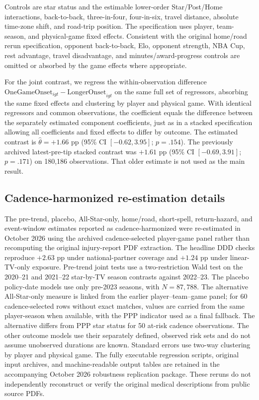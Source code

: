 \documentclass[11pt]{article}
\begin{document}
Controls are star status and the estimable lower-order Star/Post/Home interactions, back-to-back, three-in-four, four-in-six, travel distance, absolute time-zone shift, and road-trip position. The specification uses player, team-season, and physical-game fixed effects. Consistent with the original home/road rerun specification, opponent back-to-back, Elo, opponent strength, NBA Cup, rest advantage, travel disadvantage, and minutes/award-progress controls are omitted or absorbed by the game effects where appropriate.

For the joint contrast, we regress the within-observation difference $\mathrm{OneGameOnset}_{igt}-\mathrm{LongerOnset}_{igt}$ on the same full set of regressors, absorbing the same fixed effects and clustering by player and physical game. With identical regressors and common observations, the coefficient equals the difference between the separately estimated component coefficients, just as in a stacked specification allowing all coefficients and fixed effects to differ by outcome. The estimated contrast is $\hat\theta=+1.66$ pp (95\% CI $[-0.62,3.95]$; $p = .154$). The previously archived latest-pre-tip stacked contrast was $+1.61$ pp (95\% CI $[-0.69,3.91]$; $p = .171$) on 180,186 observations. That older estimate is not used as the main result.

\FloatBarrier
\subsection{Cadence-harmonized re-estimation details}\label{app:reruns}
The pre-trend, placebo, All-Star-only, home/road, short-spell, return-hazard, and event-window estimates reported as cadence-harmonized were re-estimated in October 2026 using the archived cadence-selected player-game panel rather than recomputing the original injury-report PDF extraction. The headline DDD checks reproduce $+2.63$ pp under national-partner coverage and $+1.24$ pp under linear-TV-only exposure. Pre-trend joint tests use a two-restriction Wald test on the 2020--21 and 2021--22 star-by-TV season contrasts against 2022--23. The placebo policy-date models use only pre-2023 seasons, with $N=87{,}788$. The alternative All-Star-only measure is linked from the earlier player--team--game panel; for 60 cadence-selected rows without exact matches, values are carried from the same player-season when available, with the PPP indicator used as a final fallback. The alternative differs from PPP star status for 50 at-risk cadence observations. The other outcome models use their separately defined, observed risk sets and do not assume unobserved durations are known. Standard errors use two-way clustering by player and physical game. The fully executable regression scripts, original input archives, and machine-readable output tables are retained in the accompanying October 2026 robustness replication package. These reruns do not independently reconstruct or verify the original medical descriptions from public source PDFs.
\end{document}
